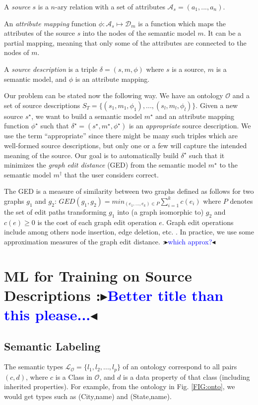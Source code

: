 \documentclass[letterpaper]{article} %
\newcommand{\authornote}[3]{
  {\fbox{\sc 
  #1}:$\blacktriangleright$\textcolor{#2}{\small{#3}}$\blacktriangleleft$}%
}
\newcommand{\ddg}[1]{\authornote{DDG}{blue}{#1}}
\begin{document}
A \emph{source} $s$ is a $n$-ary relation with a set of attributes 
$\mathcal{A}_s = 
(a_1,...,a_n)$.

An \emph{attribute mapping} function $\phi : \mathcal{A}_s \mapsto 
\mathcal{D}_m$ is a function which
maps the attributes of the source $s$ into the nodes of the semantic model $m$. 
It can be a partial mapping, meaning that only some of the attributes
are connected to the nodes of $m$.

A \emph{source description} is a triple $\delta = (s, m, \phi)$ where $s$ is a 
source, 
$m$ is a semantic
model, and $\phi$ is an attribute mapping.

Our problem can be stated now the following way. We have an ontology 
$\mathcal{O}$ and a set of source descriptions $S_T = \{(s_1, m_1, \phi_1),..., 
(s_l, m_l, \phi_l)\}$.
Given a new source $s^\star$, we want to build a semantic model $m^\star$ and 
an attribute mapping function $\phi^\star$ such that 
$\delta^\star = (s^\star,m^\star,\phi^\star)$ is an \emph{appropriate} source 
description. We
use the term ``appropriate'' since there might be many such triples which are
well-formed source descriptions, but only one or a few will capture the intended
meaning of the source. Our goal is to automatically build $\delta^\star$ such 
that it minimizes the \emph{graph edit distance} (GED) from the semantic model 
$m^\star$ to the semantic model $m^\dag$ that the user considers correct.

The GED is a measure of similarity between two graphs defined as follows for 
two graphs $g_1$ and $g_2$: $GED(g_1,g_2) = min_{(e_1 ,...,e_k)\in P} 
\sum_{i=1}^{k}c(e_i)$ where $P$ denotes the set of edit paths transforming 
$g_1$ into (a graph
isomorphic to) $g_2$ and $c(e) \geq 0$ is the cost of each graph edit operation 
$e$. Graph edit operations include among others node insertion, edge deletion, 
etc. \cite{gao2010survey}. In practice, we use some approximation measures of 
the graph edit distance. \ddg{which approx?}

\section{ML for Training on Source Descriptions \label{SEC:ML}\ddg{Better title 
than this 
please...}}


\subsection{Semantic Labeling}
The semantic types $\mathcal{L_O} = \{l_1, l_2, ..., l_p\}$ of an ontology 
correspond to all pairs $(c,d)$, where $c$ is a Class in $\mathcal{O}$, and $d$ 
is a data property of that class (including inherited properties). 
For example, from the ontology in Fig. \ref{FIG:onto}, we would get types such 
as 
(City,name) and (State,name).
\end{document}
